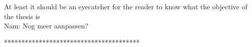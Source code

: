 At least it should be an eyecatcher for the reader to know what the objective of the thesis is\\

Nam: Nog meer aanpassen?

***************************************\\

%
%
%
%

%

%
%		


%
%

